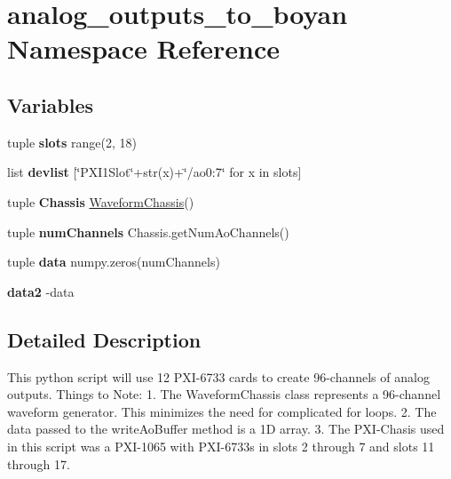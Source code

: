 \hypertarget{namespaceanalog__outputs__to__boyan}{\section{analog\-\_\-outputs\-\_\-to\-\_\-boyan Namespace Reference}
\label{namespaceanalog__outputs__to__boyan}
}
\subsection*{Variables}
\begin{DoxyCompactItemize}
\item 
\hypertarget{namespaceanalog__outputs__to__boyan_ab8d65024450941856d62b9e4f12e5619}{tuple {\bfseries slots} range(2, 18)}\label{namespaceanalog__outputs__to__boyan_ab8d65024450941856d62b9e4f12e5619}

\item 
\hypertarget{namespaceanalog__outputs__to__boyan_ab0f5239ef211bc487cb8a80b49b58de7}{list {\bfseries devlist} \mbox{[}\char`\"{}P\-X\-I1\-Slot\char`\"{}+str(x)+\char`\"{}/ao0\-:7\char`\"{} for x in slots\mbox{]}}\label{namespaceanalog__outputs__to__boyan_ab0f5239ef211bc487cb8a80b49b58de7}

\item 
\hypertarget{namespaceanalog__outputs__to__boyan_a8b46f1203089e47bb79542a6f094320b}{tuple {\bfseries Chassis} \hyperlink{class_waveform_chassis_1_1_waveform_chassis}{Waveform\-Chassis}()}\label{namespaceanalog__outputs__to__boyan_a8b46f1203089e47bb79542a6f094320b}

\item 
\hypertarget{namespaceanalog__outputs__to__boyan_a511775ab0f27086afd61395abd011f6c}{tuple {\bfseries num\-Channels} Chassis.\-get\-Num\-Ao\-Channels()}\label{namespaceanalog__outputs__to__boyan_a511775ab0f27086afd61395abd011f6c}

\item 
\hypertarget{namespaceanalog__outputs__to__boyan_a7a8ecec1294a03cd388e133c2b3f5e36}{tuple {\bfseries data} numpy.\-zeros(num\-Channels)}\label{namespaceanalog__outputs__to__boyan_a7a8ecec1294a03cd388e133c2b3f5e36}

\item 
\hypertarget{namespaceanalog__outputs__to__boyan_ab36814bb7186498bb0b55fb990f3762d}{{\bfseries data2} -\/data}\label{namespaceanalog__outputs__to__boyan_ab36814bb7186498bb0b55fb990f3762d}

\end{DoxyCompactItemize}


\subsection{Detailed Description}
\begin{DoxyVerb}This python script will use 12 PXI-6733 cards to create 96-channels of
analog outputs.
Things to Note:
1. The WaveformChassis class represents a 96-channel waveform generator.
   This minimizes the need for complicated for loops.
2. The data passed to the writeAoBuffer method is a 1D array.
3. The PXI-Chasis used in this script was a PXI-1065 with PXI-6733s in
   slots 2 through 7 and slots 11 through 17.
\end{DoxyVerb}
 